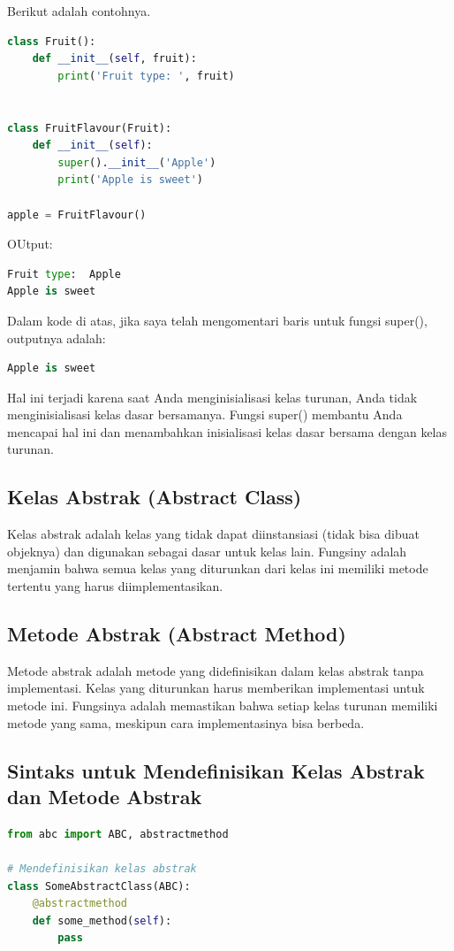 \documentclass{article}
\begin{document}
Berikut adalah contohnya.
\begin{lstlisting}[language=Python, caption={}, captionpos=b]
class Fruit():
    def __init__(self, fruit):
        print('Fruit type: ', fruit)


class FruitFlavour(Fruit):
    def __init__(self):
        super().__init__('Apple')
        print('Apple is sweet')

apple = FruitFlavour()
\end{lstlisting}
OUtput:
\begin{lstlisting}[language=Python, caption={}, captionpos=b]
Fruit type:  Apple
Apple is sweet
\end{lstlisting}

Dalam kode di atas, jika saya telah mengomentari baris untuk fungsi super(), outputnya adalah:
\begin{lstlisting}[language=Python, caption={}, captionpos=b]
Apple is sweet
\end{lstlisting}
Hal ini terjadi karena saat Anda menginisialisasi kelas turunan, Anda tidak menginisialisasi kelas dasar bersamanya. Fungsi super() membantu Anda mencapai hal ini dan menambahkan inisialisasi kelas dasar bersama dengan kelas turunan.

\subsection{Kelas Abstrak (Abstract Class)}
Kelas abstrak adalah kelas yang tidak dapat diinstansiasi (tidak bisa dibuat objeknya) dan digunakan sebagai dasar untuk kelas lain.
Fungsiny adalah menjamin bahwa semua kelas yang diturunkan dari kelas ini memiliki metode tertentu yang harus diimplementasikan.

\subsection{Metode Abstrak (Abstract Method)}
Metode abstrak adalah metode yang didefinisikan dalam kelas abstrak tanpa implementasi. Kelas yang diturunkan harus memberikan implementasi untuk metode ini.
Fungsinya adalah memastikan bahwa setiap kelas turunan memiliki metode yang sama, meskipun cara implementasinya bisa berbeda.

\subsection{Sintaks untuk Mendefinisikan Kelas Abstrak dan Metode Abstrak}
\begin{lstlisting}[language=Python, caption={}, captionpos=b]
from abc import ABC, abstractmethod

# Mendefinisikan kelas abstrak
class SomeAbstractClass(ABC):
    @abstractmethod
    def some_method(self):
        pass
\end{lstlisting}
\end{document}
